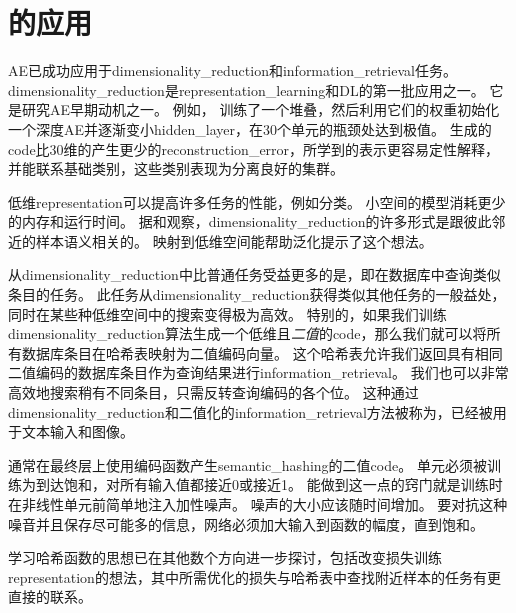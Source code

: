 
\section{的应用}
\label{sec:applications_of_autoencoders}

\gls{AE}已成功应用于\gls{dimensionality_reduction}和\gls{information_retrieval}任务。
\gls{dimensionality_reduction}是\gls{representation_learning}和\gls{DL}的第一批应用之一。
它是研究\gls{AE}早期动机之一。
例如， \citet{Hinton-Science2006}训练了一个堆叠，然后利用它们的权重初始化一个深度\gls{AE}并逐渐变小\gls{hidden_layer}，在30个单元的瓶颈处达到极值。
生成的\gls{code}比30维的产生更少的\gls{reconstruction_error}，所学到的表示更容易定性解释，并能联系基础类别，这些类别表现为分离良好的集群。


低维\gls{representation}可以提高许多任务的性能，例如分类。
小空间的模型消耗更少的内存和运行时间。
据\citet{Salakhutdinov+Hinton2007-small}和\citet{Torralba+Fergus+Weiss-2008}观察，\gls{dimensionality_reduction}的许多形式是跟彼此邻近的样本语义相关的。
映射到低维空间能帮助泛化提示了这个想法。


从\gls{dimensionality_reduction}中比普通任务受益更多的是，即在数据库中查询类似条目的任务。
此任务从\gls{dimensionality_reduction}获得类似其他任务的一般益处，同时在某些种低维空间中的搜索变得极为高效。
特别的，如果我们训练\gls{dimensionality_reduction}算法生成一个低维且\emph{二值}的\gls{code}，那么我们就可以将所有数据库条目在哈希表映射为二值编码向量。
这个哈希表允许我们返回具有相同二值编码的数据库条目作为查询结果进行\gls{information_retrieval}。
我们也可以非常高效地搜索稍有不同条目，只需反转查询编码的各个位。
这种通过\gls{dimensionality_reduction}和二值化的\gls{information_retrieval}方法被称为\citep{Salakhutdinov+Hinton2007-small,Salakhutdinov+Geoff-2009}，已经被用于文本输入\citep{Salakhutdinov+Hinton2007-small,Salakhutdinov+Geoff-2009}和图像\citep{Torralba+Fergus+Weiss-2008,WeissTF08,KrizhevskyH11}。


通常在最终层上使用编码函数产生\gls{semantic_hashing}的二值\gls{code}。
单元必须被训练为到达饱和，对所有输入值都接近0或接近1。
能做到这一点的窍门就是训练时在非线性单元前简单地注入加性噪声。
噪声的大小应该随时间增加。
要对抗这种噪音并且保存尽可能多的信息，网络必须加大输入到函数的幅度，直到饱和。


学习哈希函数的思想已在其他数个方向进一步探讨，包括改变损失训练\gls{representation}的想法，其中所需优化的损失与哈希表中查找附近样本的任务有更直接的联系\citep{Norouzi+Fleet-ICML2011}。
